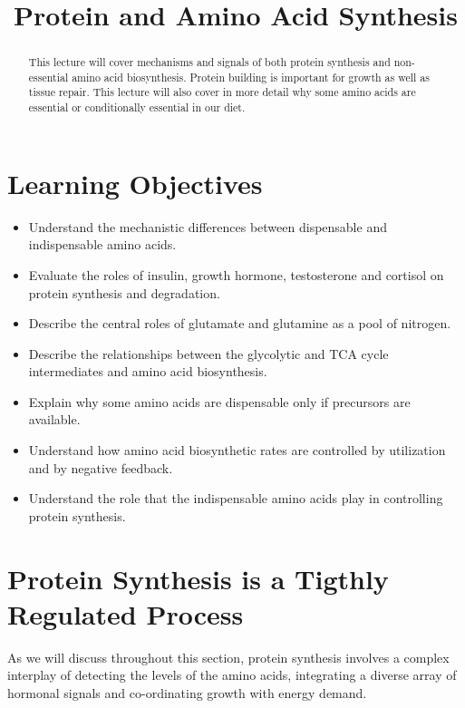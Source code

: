 \documentclass{tufte-handout}
\title{Protein and Amino Acid Synthesis}
\author{}
\date{}  %
\begin{document}
\maketitle%

\begin{abstract}
\noindent This lecture will cover mechanisms and signals of both protein synthesis and non-essential amino acid biosynthesis.  Protein building is important for growth as well as tissue repair.  This lecture will also cover in more detail why some amino acids are essential or conditionally essential in our diet.
\end{abstract}

\tableofcontents

\pagebreak
\section{Learning Objectives}

\begin{itemize}
\item Understand the mechanistic differences between dispensable and indispensable amino acids.
\item Evaluate the roles of insulin, growth hormone, testosterone and cortisol on protein synthesis and degradation.
\item Describe the central roles of glutamate and glutamine as a pool of nitrogen.
\item Describe the relationships between the glycolytic and TCA cycle intermediates and amino acid biosynthesis.
\item Explain why some amino acids are dispensable only if precursors are available.
\item Understand how amino acid biosynthetic rates are controlled by utilization and by negative feedback.
\item Understand the role that the indispensable amino acids play in controlling protein synthesis.
\end{itemize}

\section{Protein Synthesis is a Tigthly Regulated Process}

As we will discuss throughout this section, protein synthesis involves a complex interplay of detecting the levels of the amino acids, integrating a diverse array of hormonal signals and co-ordinating growth with energy demand.
\end{document}
